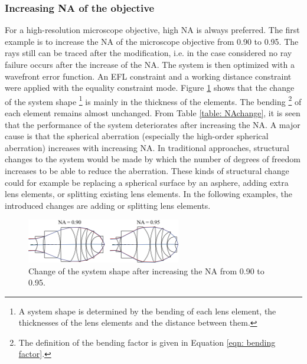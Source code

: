 \subsubsection{Increasing NA of the objective}
For a high-resolution microscope objective, high NA is always preferred. The first example is to increase the NA of the microscope objective from 0.90 to 0.95. The rays still can be traced after the modification, i.e. in the case considered no ray failure occurs after the increase of the NA. The system is then optimized with a wavefront error function. An EFL constraint and a working distance constraint were applied with the equality constraint mode. Figure \ref{fig: vollrathNA90295} shows that the change of the system shape \footnote{A system shape is determined by the bending of each lens element, the thicknesses of the lens elements and  the distance between them.} is mainly in the thickness of the elements. The bending \footnote{The definition of the bending factor is given in Equation \ref{eqn: bending factor}.} of each element remains almost unchanged. From Table \ref{table: NAchange}, it is seen that the performance of the system deteriorates after increasing the NA. A major cause is that the spherical aberration (especially the high-order spherical aberration) increases with increasing NA. In traditional approaches, structural changes to the system would be made by which the number of degrees of freedom increases to be able to reduce the aberration. These kinds of structural change could for example be replacing a spherical surface by an asphere, adding extra lens elements, or splitting existing lens elements. In the following examples, the introduced changes are adding or splitting lens elements.

\begin{figure}[h!]
    \centering
    \includegraphics[width=0.6\textwidth]{chapter-4/figures/Vollrath_NA90295.png}
    \caption{Change of the system shape after increasing the NA from 0.90 to 0.95.}
    \label{fig: vollrathNA90295}
\end{figure}

